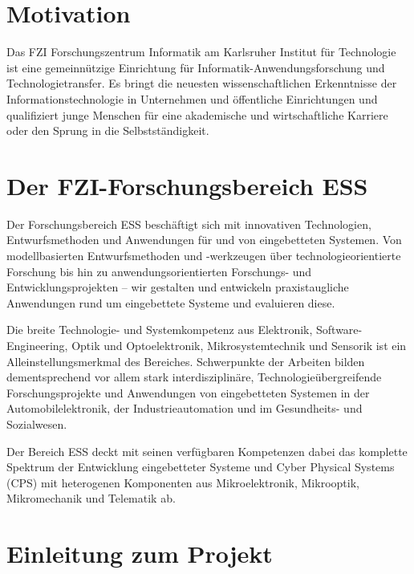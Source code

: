 
\section{Motivation}
\label{sec:FZI}
\glqq Das FZI Forschungszentrum Informatik am Karlsruher Institut für Technologie ist eine gemeinnützige Einrichtung für Informatik-Anwendungsforschung und Technologietransfer. Es bringt die neuesten wissenschaftlichen Erkenntnisse der Informationstechnologie in Unternehmen und öffentliche Einrichtungen und qualifiziert junge Menschen für eine akademische und wirtschaftliche Karriere oder den Sprung in die Selbstständigkeit.\grqq{} \cite{FZI_info}

\section{Der FZI-Forschungsbereich ESS}
\label{sec:ESS}
\glqq Der Forschungsbereich \acf{ESS} beschäftigt sich mit innovativen Technologien, Entwurfsmethoden und Anwendungen für und von eingebetteten Systemen. Von modellbasierten Entwurfsmethoden und -werkzeugen über technologieorientierte Forschung bis hin zu anwendungsorientierten Forschungs- und Entwicklungsprojekten – wir gestalten und entwickeln praxistaugliche Anwendungen rund um eingebettete Systeme und evaluieren diese.

Die breite Technologie- und Systemkompetenz aus Elektronik, Software-Engineering, Optik und Optoelektronik, Mikrosystemtechnik und Sensorik ist ein Alleinstellungsmerkmal des Bereiches. Schwerpunkte der Arbeiten bilden dementsprechend vor allem stark interdisziplinäre, Technologieübergreifende Forschungsprojekte und Anwendungen von eingebetteten Systemen in der Automobilelektronik, der Industrieautomation und im Gesundheits- und Sozialwesen.

Der Bereich ESS deckt mit seinen verfügbaren Kompetenzen dabei das komplette Spektrum der Entwicklung eingebetteter Systeme und Cyber Physical Systems (CPS) mit heterogenen Komponenten aus Mikroelektronik, Mikrooptik, Mikromechanik und Telematik ab.\grqq{}  \cite{ESS}




\newpage
\section{Einleitung zum Projekt}
\label{sec:Porjekt}

